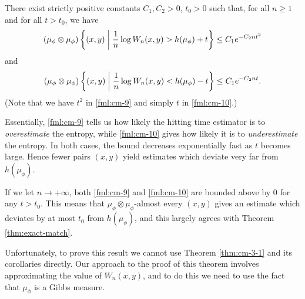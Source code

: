 \begin{theorem} \label{thm:cm-4-3}
	There exist strictly positive constants $C_1, C_2 > 0$, $t_0 > 0$ such that, for all $n \geq 1$ and for all $t > t_0$, we have
	\begin{equation}
		(\mu_\phi \otimes \mu_\phi)\left\{(x, y) \mathrel{}\middle|\mathrel{} \frac{1}{n}\log{W_n(x, y)} > h(\mu_\phi) + t\right\} \leq C_1 e^{-C_2 nt^2} \label{fml:cm-9}
	\end{equation}
	and
	\begin{equation}
		(\mu_\phi \otimes \mu_\phi)\left\{(x, y) \mathrel{}\middle|\mathrel{} \frac{1}{n}\log{W_n(x, y)} < h(\mu_\phi) - t\right\} \leq C_1 e^{-C_2 nt}. \label{fml:cm-10}
	\end{equation}
	(Note that we have $t^2$ in \eqref{fml:cm-9} and simply $t$ in \eqref{fml:cm-10}.)
	
	Essentially, \eqref{fml:cm-9} tells us how likely the hitting time estimator is to \emph{overestimate} the entropy, while \eqref{fml:cm-10} gives how likely it is to \emph{underestimate} the entropy. In both cases, the bound decreases exponentially fast as $t$ becomes large. Hence fewer pairs $(x, y)$ yield estimates which deviate very far from $h(\mu_\phi)$.
	
	If we let $n \to +\infty$, both \eqref{fml:cm-9} and \eqref{fml:cm-10} are bounded above by $0$ for any $t > t_0$. This means that $\mu_\phi \otimes \mu_\phi$-almost every $(x, y)$ gives an estimate which deviates by at most $t_0$ from $h(\mu_\phi)$, and this largely agrees with Theorem \ref{thm:exact-match}.
	
	Unfortunately, to prove this result we cannot use Theorem \ref{thm:cm-3-1} and its corollaries directly. Our approach to the proof of this theorem involves approximating the value of $W_n(x, y)$, and to do this we need to use the fact that $\mu_\phi$ is a Gibbs measure.
	

\end{theorem}
